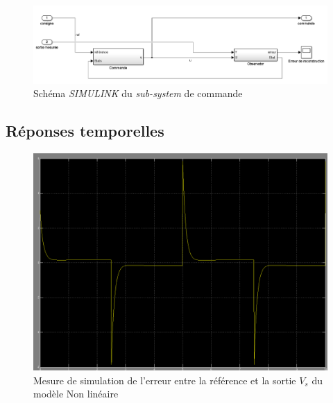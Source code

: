 \begin{figure}[!ht]
\centering
\includegraphics[width = \textwidth]{./annexes/annexe3/NL_RE_blocAsservissement.PNG}
\caption{Schéma \emph{SIMULINK} du \emph{sub-system} de commande\label{fig:SIMULINK_NL_subsystem_schema}}
\end{figure}

\subsection*{Réponses temporelles}
\begin{figure}[!ht]
\centering
\includegraphics[width = .9\textwidth]{./annexes/annexe3/NL_erreur-Consigne_Vs_RE.png}
\caption{Mesure de simulation de l'erreur entre la référence et la sortie $V_s$ du modèle Non linéaire\label{fig:SIMULINK_NL_erreur_reponse}}
\end{figure}

